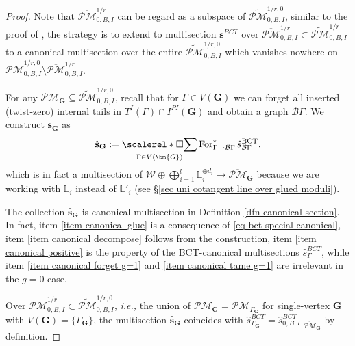\documentclass[11pt]{amsart}
\theoremstyle{definition}
\theoremstyle{remark}
\newcommand{\oPMb}{{\overline{\mathcal{PM}}}}
\newcommand{\<}{\left<}
\renewcommand{\>}{\right>}
\numberwithin{equation}{section}
\DeclareMathOperator*{\bboxplus}{\scalerel*{\boxplus}{\sum}}
\begin{document}
    
    \begin{proof}
        Note that $\oPMb^{1/r}_{0,B,I}$ can be regard as a subspace of $\widetilde{\mathcal{PM}}^{1/r,0}_{0,B,I}$, similar to the proof of \cite[Theorem 5.2]{TZ2}, the strategy is to extend to multisection $\mathbf{s}^{BCT}$ over $\oPMb^{1/r}_{0,B,I}\subset \widetilde{\mathcal{PM}}^{1/r}_{0,B,I}$ to a canonical multisection over the entire $\widetilde{\mathcal{PM}}^{1/r,0}_{0,B,I}$ which vanishes nowhere on $\widetilde{\mathcal{PM}}^{1/r,0}_{0,B,I} \setminus \oPMb^{1/r}_{0,B,I}$.

        

    For any $\oPMb_{\bm{G}}\subseteq \widetilde{\mathcal{PM}}^{1/r,0}_{0,B,I} $, recall that for $\Gamma \in V(\bm{G})$ we can forget all inserted (twist-zero) internal tails in $T^I(\Gamma)\cap I^{PI}(\bm{G})$ and obtain a graph $\mathcal B \Gamma$. We construct $\mathbf{s}_{\mathbf{G}}$ as
    $$
    \hat{\mathbf{s}}_{\mathbf{G}}:=\bboxplus_{\Gamma \in V(\bm{G})}  \operatorname{For}^*_{\Gamma \to \mathcal B \Gamma} \hat {s}^{\text{BCT}}_{\mathcal B \Gamma}.
    $$
    which is in fact a multisection of $\mathcal W \oplus \bigoplus_{i=1}^l \mathbb L_i^{\oplus d_i}\to \oPMb_{\bm{G}}$ because we are working with $\mathbb L_i$ instead of $\mathbb L'_i$ (see \S \ref{sec uni cotangent line over glued moduli}).

    The collection $\hat {\mathbf{s}}_{\mathbf{G}}$ is canonical multisection in Definition \ref{dfn canonical section}. In fact, item \ref{item canonical glue} is a consequence of \eqref{eq bct special canonical}, item \ref{item canonical decompose} follows from the construction, item \ref{item canonical positive} is the property of the BCT-canonical multisections $\hat{s}^{BCT}_{\Gamma}$, while item \ref{item canonical forget g=1} and \ref{item canonical tame g=1} are irrelevant in the $g=0$ case.

    Over $\oPMb^{1/r}_{0,B,I}\subset \widetilde{\mathcal{PM}}^{1/r,0}_{0,B,I}$, \textit{i.e.,} the union of $\oPMb_{\bm{G}}=\oPMb_{\Gamma_{\bm{G}}}$ for single-vertex $\bm{G}$ with $V(\bm{G})=\{\Gamma_{\bm{G}}\}$, the multisection $\hat{\bm{s}}_{\mathbf{G}}$ coincides with $\hat{s}^{BCT}_{\Gamma_{\bm{G}}}=\hat {s}_{0,B,I}^{BCT}\vert_{\oPMb_{\bm{G}}}$ by definition. 
    

\end{proof}
\end{document}
